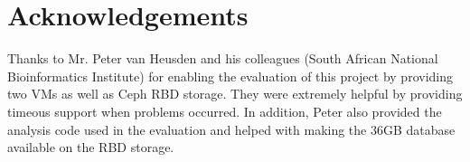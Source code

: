 \documentclass{sig-alternate-05-2015}
\begin{document}
\section{Acknowledgements}
Thanks to Mr. Peter van Heusden and his colleagues (South African National Bioinformatics Institute) for enabling the evaluation of this project by providing two VMs as well as Ceph RBD storage. They were extremely helpful by providing timeous support when problems occurred. In addition, Peter also provided the analysis code used in the evaluation and helped with making the 36GB database available on the RBD storage.
\\

 
\end{document}
